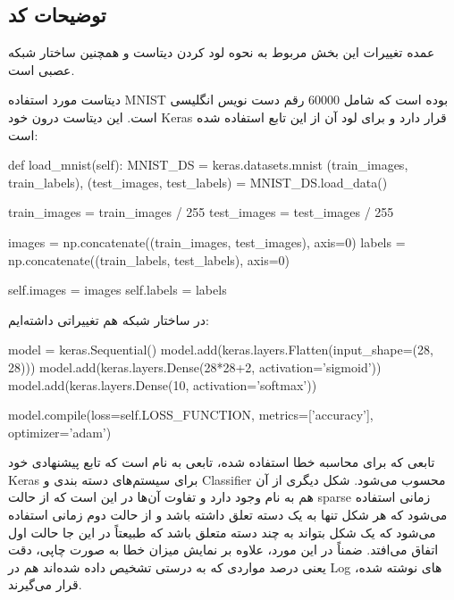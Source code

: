 \documentclass[12pt,titlepage,a4page , tikz , multi,table , svgnames,xcdraw]{article}
\begin{document}
\subsection{توضیحات کد}

عمده تغییرات این بخش مربوط به نحوه لود کردن دیتاست و همچنین ساختار شبکه عصبی است.

دیتاست مورد استفاده MNIST بوده است که شامل $60000$ رقم دست نویس انگلیسی است. این دیتاست درون خود Keras قرار دارد و برای لود آن از این تابع استفاده شده است:

\begin{latin}
\begin{python}[language=Python]

  def load_mnist(self):
        MNIST_DS = keras.datasets.mnist
        (train_images, train_labels), (test_images, test_labels)
         = MNIST_DS.load_data()

        train_images = train_images / 255
        test_images = test_images / 255

        images = np.concatenate((train_images, test_images), axis=0)
        labels = np.concatenate((train_labels, test_labels), axis=0)

        self.images = images
        self.labels = labels

\end{python}

\end{latin}

در ساختار شبکه هم تغییراتی داشته‌ایم:


\begin{latin}
\begin{python}[language=Python]

 model = keras.Sequential()
            model.add(keras.layers.Flatten(input_shape=(28, 28)))
            model.add(keras.layers.Dense(28*28+2,
             activation='sigmoid'))
            model.add(keras.layers.Dense(10, activation='softmax'))

            model.compile(loss=self.LOSS_FUNCTION, metrics=['accuracy'],
             optimizer='adam')

\end{python}

\end{latin}


تابعی که برای محاسبه خطا استفاده شده، تابعی به نام  است که تابع پیشنهادی خود Keras برای سیستم‌های دسته بندی و Classifier محسوب می‌شود. شکل دیگری از آن هم به نام  وجود دارد و تفاوت آن‌ها در این است که از حالت sparse زمانی استفاده می‌شود که هر شکل تنها به یک دسته تعلق داشته باشد و از حالت دوم زمانی استفاده می‌شود که یک شکل بتواند به چند دسته متعلق باشد که طبیعتاً در این جا حالت اول اتفاق می‌افتد. ضمناً در این مورد، علاوه بر نمایش میزان خطا به صورت چاپی، دقت یعنی درصد مواردی که به درستی تشخیص داده شده‌اند هم در Log های نوشته شده، قرار می‌گیرند.
\end{document}

